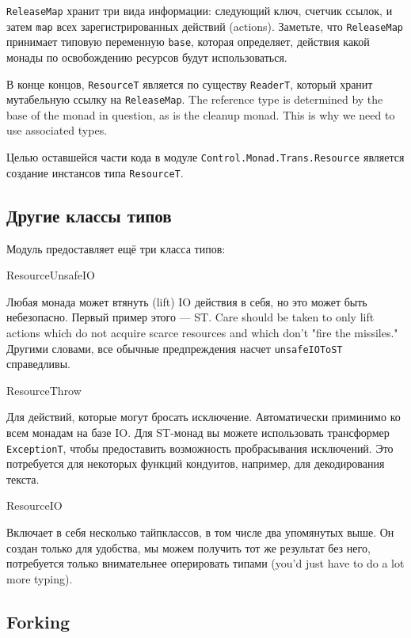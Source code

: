\lstinline'ReleaseMap' хранит три вида информации: следующий ключ, счетчик ссылок, и затем
\lstinline'map' всех
зарегистрированных действий (actions). Заметьте, что \lstinline'ReleaseMap' принимает
типовую переменную \lstinline'base', которая определяет, действия какой монады по
освобождению ресурсов  будут использоваться.

В конце концов, \lstinline'ResourceT' является по существу \lstinline'ReaderT', который
хранит мутабельную
ссылку на \lstinline'ReleaseMap'. The reference type is determined by the base
of the monad in question, as is the cleanup monad. This is why we need to use associated
types.

Целью оставшейся части кода в модуле \lstinline'Control.Monad.Trans.Resource'
является создание инстансов типа \lstinline'ResourceT'.

\subsection{Другие классы типов}

Модуль предоставляет ещё три класса типов:
   
ResourceUnsafeIO

Любая монада может втянуть (lift) IO действия в себя, но это может быть небезопасно.
Первый пример этого --- ST. Care should be taken to
only lift actions which do not acquire scarce resources and which don't "fire the
missiles." Другими словами, все обычные предпреждения насчет \lstinline'unsafeIOToST'
справедливы.
  
ResourceThrow

Для действий, которые могут бросать исключение. Автоматически приминимо ко всем
монадам на базе IO. Для ST-монад вы можете использовать трансформер
\lstinline'ExceptionT', чтобы
предоставить возможность пробрасывания исключений. Это потребуется для некоторых функций
кондуитов, например, для декодирования текста.
   
ResourceIO

Включает в себя несколько тайпклассов, в том числе два
упомянутых выше. Он создан только для удобства, мы можем получить тот же результат без
него, потребуется только внимательнее оперировать типами (you'd just have to do a lot
more typing).
   
\subsection{Forking}

